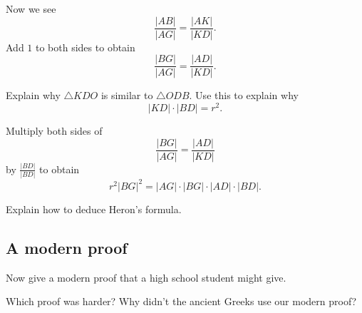 \documentclass{ximera}
\begin{document}
\begin{question}
Now we see 
\[
\frac{|AB|}{|AG|} = \frac{|AK|}{|KD|}.
\]
Add $1$ to both sides to obtain
\[
\frac{|BG|}{|AG|} = \frac{|AD|}{|KD|}.
\]
\end{question}


\begin{question}
Explain why $\triangle KDO$ is similar to $\triangle ODB$. Use this to explain why
\[
|KD|\cdot|BD| = r^2.
\]
\end{question}

\begin{question}
Multiply both sides of 
\[
\frac{|BG|}{|AG|} = \frac{|AD|}{|KD|}
\]
by $\frac{|BD|}{|BD|}$ to obtain
\[
r^2|BG|^2 = |AG|\cdot |BG|\cdot |AD|\cdot |BD|.
\]
\end{question}


\begin{question}
Explain how to deduce Heron's formula.
\end{question}


\subsection*{A modern proof}

\begin{question}
Now give a modern proof that a high school student might give. 
\end{question}

\begin{question}
Which proof was harder? Why didn't the ancient Greeks use our modern
proof?
\end{question}
\end{document}
